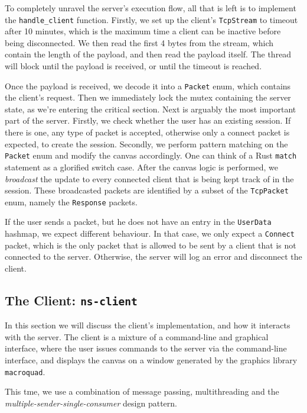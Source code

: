 \documentclass{article}
\newcommand{\code}[1]{\texttt{#1}}
\begin{document}
To completely unravel the server's execution flow, all that is left is to
implement the \code{handle\_client} function. Firstly, we set up the client's
\code{TcpStream} to timeout after 10 minutes, which is the maximum time a client
can be inactive before being disconnected. We then read the first 4 bytes from
the stream, which contain the length of the payload, and then read the payload
itself. The thread will block until the payload is received, or until the
timeout is reached.

Once the payload is received, we decode it into a \code{Packet} enum, which
contains the client's request. Then we immediately lock the mutex containing the
server state, as we're entering the critical section. Next is arguably the most
important part of the server. Firstly, we check whether the user has an existing
session. If there is one, any type of packet is accepted, otherwise only a
connect packet is expected, to create the session. Secondly, we perform pattern
matching on the \code{Packet} enum and modify the canvas accordingly. One can
think of a Rust \code{match} statement as a glorified switch case. After the
canvas logic is performed, we \textit{broadcast} the update to every connected
client that is being kept track of in the session. These broadcasted packets are
identified by a subset of the \code{TcpPacket} enum, namely the \code{Response}
packets.

If the user sends a packet, but he does not have an entry in the \code{UserData}
hashmap, we expect different behaviour. In that case, we only expect a
\code{Connect} packet, which is the only packet that is allowed to be sent by a
client that is not connected to the server. Otherwise, the server will log an
error and disconnect the client.

\newpage

\subsection{The Client: \code{ns-client}}

In this section we will discuss the client's implementation, and how it
interacts with the server. The client is a mixture of a command-line and
graphical interface, where the user issues commands to the server via the
command-line interface, and displays the canvas on a window generated by the
graphics library \code{macroquad}.


This tme, we use a combination of message passing, multithreading and the
\textit{multiple-sender-single-consumer} design pattern.
\end{document}
